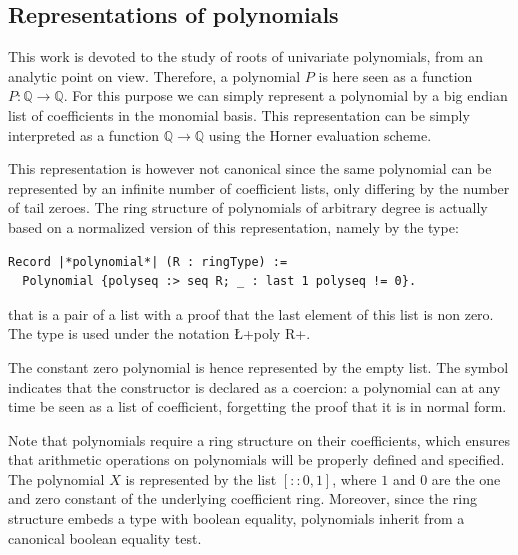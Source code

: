 \documentclass{mscs}
\begin{document}
\subsection{Representations of polynomials}

This work is devoted to the study of roots of univariate polynomials,
from an analytic point on view.  Therefore, a polynomial $P$ is here seen
as a function $P : \mathbb{Q} \rightarrow \mathbb{Q}$. For this
purpose we can simply represent a polynomial by a big endian list
of coefficients in the monomial basis. This representation can be
simply interpreted as a function $ \mathbb{Q} \rightarrow \mathbb{Q}$
using the Horner evaluation scheme.

This representation is however not canonical since the same
polynomial can be represented by an infinite number of coefficient
lists, only differing by the number of tail zeroes. The ring structure
of polynomials of arbitrary degree is actually based on a normalized version of
this representation, namely by the type:
\begin{lstlisting}
Record |*polynomial*| (R : ringType) :=
  Polynomial {polyseq :> seq R; _ : last 1 polyseq != 0}.
\end{lstlisting}
that is a pair of a list  with a proof that the
last element of this list is non zero. The type  is
used under the notation \L+{poly R}+.

The constant zero polynomial is
hence represented by the empty list. The \C{:>} symbol indicates that
the  constructor is declared as a coercion: a polynomial
can at any time be seen as a list of coefficient, forgetting the
proof that it is in normal form.

Note that polynomials require a ring structure on their coefficients,
which ensures that arithmetic operations on polynomials will be
properly defined and specified. The polynomial $X$ is represented
by the list $[:: 0, 1]$, where $1$ and $0$ are the one and zero
constant of the underlying coefficient ring.
Moreover, since the \ssr{} ring structure
embeds a type with boolean equality, polynomials inherit from a
canonical boolean equality test.
\end{document}
